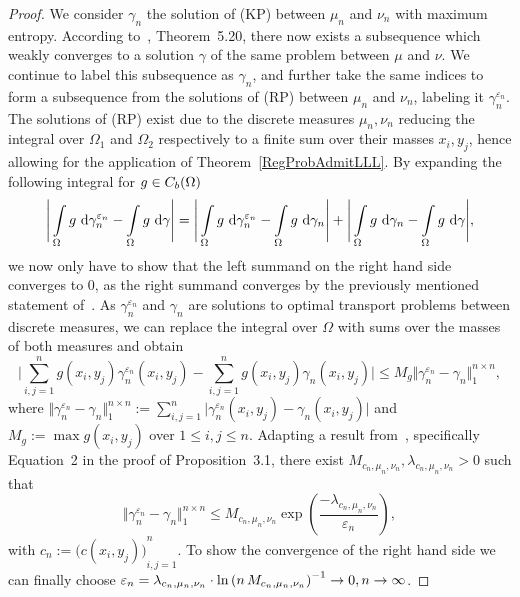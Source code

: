 \begin{proof}
	We consider $\gamma_n$ the solution of (KP) between $\mu_n$ and $\nu_n$ with maximum entropy. According to~\cite{Vill2009}, Theorem~5.20, there now exists a subsequence which weakly converges to a solution $\gamma$ of the same problem between $\mu$ and $\nu$. We continue to label this subsequence as $\gamma_n$, and further take the same indices to form a subsequence from the solutions of (RP) between $\mu_n$ and $\nu_n$, labeling it $\gamma_n^{\varepsilon_n}$. The solutions of (RP) exist due to the discrete measures $\mu_n, \nu_n$ reducing the integral over $\Omega_1$ and $\Omega_2$ respectively to a finite sum over their masses $x_i, y_j$, hence allowing for the application of Theorem~\ref{RegProbAdmitLLL}. By expanding the following integral for $g \in \CF[b]{\Omega}$
	\[ \Bigg\lvert \int\limits_{\Omega} g~\D[\gamma_n^{\varepsilon_n}] - \int\limits_{\Omega} g~\D[\gamma] \Bigg\rvert = \Bigg\lvert \int\limits_{\Omega} g~\D[\gamma_n^{\varepsilon_n}] - \int\limits_{\Omega} g~\D[\gamma_n] \Bigg\rvert + \Bigg\lvert \int\limits_{\Omega} g~\D[\gamma_n] - \int\limits_{\Omega} g~\D[\gamma] \Bigg\rvert, \]
	we now only have to show that the left summand on the right hand side converges to $0$, as the right summand converges by the previously mentioned statement of~\cite{Vill2009}. As $\gamma_n^{\varepsilon_n}$ and $\gamma_n$ are solutions to optimal transport problems between discrete measures, we can replace the integral over $\Omega$ with sums over the masses of both measures and obtain
	\[ \Bigg\lvert \sum\limits_{i, j = 1}^n g(x_i, y_j) \gamma_n^{\varepsilon_n}(x_i, y_j) - \sum\limits_{i, j = 1}^n g(x_i, y_j) \gamma_n(x_i, y_j) \Bigg\rvert \le M_g \Vert \gamma_n^{\varepsilon_n} - \gamma_n \Vert_{1}^{n \times n}, \]
	where $\Vert \gamma_n^{\varepsilon_n} - \gamma_n \Vert_{1}^{n \times n} := \sum\limits_{i, j = 1}^n \big\lvert \gamma_n^{\varepsilon_n}(x_i, y_j) - \gamma_n(x_i, y_j) \big\rvert$ and $M_g := \max g(x_i, y_j)$ over $1 \le i, j \le n$. Adapting a result from~\cite{Comi1994}, specifically Equation~2 in the proof of Proposition~3.1, there exist $M_{c_n, \mu_n, \nu_n}, \lambda_{c_n, \mu_n, \nu_n} > 0$ such that
	\[ \Vert \gamma_n^{\varepsilon_n} - \gamma_n \Vert_1^{n \times n} \le M_{c_n, \mu_n, \nu_n} \exp\left( \frac{-\lambda_{c_n, \mu_n, \nu_n}}{\varepsilon_n} \right), \]
	with $c_n := {\big( c(x_i, y_j) \big)}_{i, j = 1}^n$. To show the convergence of the right hand side we can finally choose $\varepsilon_n = \lambda_{c_n, \mu_n, \nu_n} \cdot {\ln\left( n\,M_{c_n, \mu_n, \nu_n} \right)}^{-1} \rightarrow 0, \Ninf$.
\end{proof}

